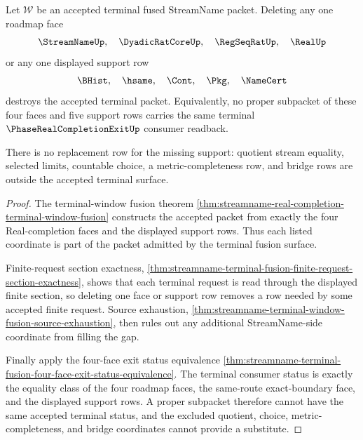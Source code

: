 \begin{theorem}
\label{thm:streamname-terminal-fusion-support-minimality}
Let $\mathcal W$ be an accepted terminal fused StreamName packet. Deleting any
one roadmap face
$$
\StreamNameUp,\quad \DyadicRatCoreUp,\quad \RegSeqRatUp,\quad \RealUp
$$
or any one displayed support row
$$
\BHist,\quad \hsame,\quad \Cont,\quad \Pkg,\quad \NameCert
$$
destroys the accepted terminal packet. Equivalently, no proper subpacket of
these four faces and five support rows carries the same terminal
$\PhaseRealCompletionExitUp$ consumer readback.

There is no replacement row for the missing support: quotient stream equality,
selected limits, countable choice, a metric-completeness row, and bridge rows
are outside the accepted terminal surface.
\end{theorem}
\begin{proof}
The terminal-window fusion theorem
\autoref{thm:streamname-real-completion-terminal-window-fusion} constructs the
accepted packet from exactly the four Real-completion faces and the displayed
support rows. Thus each listed coordinate is part of the packet admitted by the
terminal fusion surface.

Finite-request section exactness,
\autoref{thm:streamname-terminal-fusion-finite-request-section-exactness},
shows that each terminal request is read through the displayed finite section,
so deleting one face or support row removes a row needed by some accepted
finite request. Source exhaustion,
\autoref{thm:streamname-terminal-window-fusion-source-exhaustion}, then rules
out any additional StreamName-side coordinate from filling the gap.

Finally apply the four-face exit status equivalence
\autoref{thm:streamname-terminal-fusion-four-face-exit-status-equivalence}.
The terminal consumer status is exactly the equality class of the four roadmap
faces, the same-route exact-boundary face, and the displayed support rows. A
proper subpacket therefore cannot have the same accepted terminal status, and
the excluded quotient, choice, metric-completeness, and bridge coordinates
cannot provide a substitute.
\end{proof}

